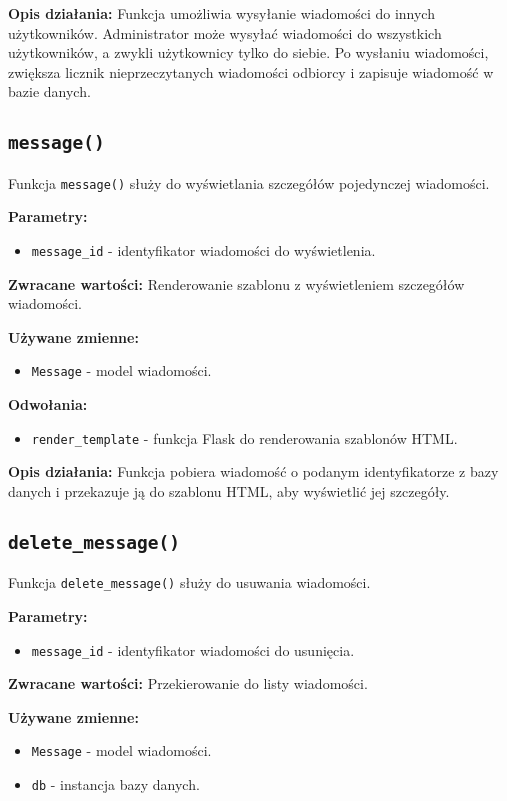 \documentclass[12pt,a4paper]{report}
\begin{document}
\textbf{Opis działania:}
Funkcja umożliwia wysyłanie wiadomości do innych użytkowników. Administrator może wysyłać wiadomości do wszystkich użytkowników, a zwykli użytkownicy tylko do siebie. Po wysłaniu wiadomości, zwiększa licznik nieprzeczytanych wiadomości odbiorcy i zapisuje wiadomość w bazie danych.

\subsection{\texttt{message()}}
\label{sec:message}
Funkcja \texttt{message()} służy do wyświetlania szczegółów pojedynczej wiadomości.

\textbf{Parametry:}
\begin{itemize}
    \item \texttt{message\_id} - identyfikator wiadomości do wyświetlenia.
\end{itemize}

\textbf{Zwracane wartości:} Renderowanie szablonu z wyświetleniem szczegółów wiadomości.

\textbf{Używane zmienne:}
\begin{itemize}
    \item \texttt{Message} - model wiadomości.
\end{itemize}

\textbf{Odwołania:}
\begin{itemize}
    \item \texttt{render\_template} - funkcja Flask do renderowania szablonów HTML.
\end{itemize}

\textbf{Opis działania:}
Funkcja pobiera wiadomość o podanym identyfikatorze z bazy danych i przekazuje ją do szablonu HTML, aby wyświetlić jej szczegóły.

\subsection{\texttt{delete\_message()}}
\label{sec:delete_message}
Funkcja \texttt{delete\_message()} służy do usuwania wiadomości.

\textbf{Parametry:}
\begin{itemize}
    \item \texttt{message\_id} - identyfikator wiadomości do usunięcia.
\end{itemize}

\textbf{Zwracane wartości:} Przekierowanie do listy wiadomości.

\textbf{Używane zmienne:}
\begin{itemize}
    \item \texttt{Message} - model wiadomości.
    \item \texttt{db} - instancja bazy danych.
\end{itemize}
\end{document}
